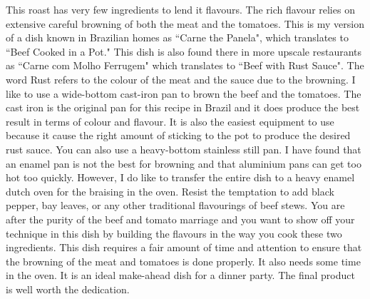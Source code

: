 \documentclass[11pt,letterpaper]{article}
\begin{document}


This roast has very few ingredients to lend it flavours. The rich flavour relies on extensive careful browning of both the meat and the tomatoes. This is my version of a dish known in Brazilian homes as ``Carne the Panela", which translates to ``Beef Cooked in a Pot." This dish is also found there in more upscale restaurants as ``Carne com Molho Ferrugem" which translates to ``Beef with Rust Sauce". The word Rust refers to the colour of the meat and the sauce due to the browning. I like to use a wide-bottom cast-iron pan to brown the beef and the tomatoes. The cast iron is the original pan for this recipe in Brazil and it does produce the best result in terms of colour and flavour. It is also the easiest equipment to use because it cause the right amount of sticking to the pot to produce the desired rust sauce. You can also use a heavy-bottom stainless still pan. I have found that an enamel pan is not the best for browning and that aluminium pans can get too hot too quickly. However, I do like to transfer the entire dish to a heavy enamel dutch oven for the braising in the oven. Resist the temptation to add black pepper, bay leaves, or any other traditional flavourings of beef stews. You are after the purity of the beef and tomato marriage and you want to show off your technique in this dish by building the flavours in the way you cook these two ingredients. This dish requires a fair amount of time and attention to ensure that the browning of the meat and tomatoes is done properly. It also needs some time in the oven. It is an ideal make-ahead dish for a dinner party. The final product is well worth the dedication.
 
\end{document}
